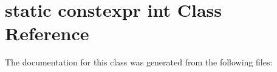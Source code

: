 \hypertarget{classstatic_01constexpr_01int}{}\section{static constexpr int Class Reference}
\label{classstatic_01constexpr_01int}


The documentation for this class was generated from the following files\+: